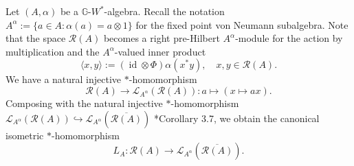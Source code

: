 \documentclass[reqno]{amsart}
\numberwithin{equation}{section}
\DeclareMathOperator{\id}{\mathrm{id}}
\newcommand{\G}{\mathbb{G}}
\begin{document}
Let $(A, \alpha)$ be a $\G$-$W^*$-algebra. Recall the notation $A^\alpha:= \{a\in A: \alpha(a)= a \otimes 1\}$ for the fixed point von Neumann subalgebra. Note that the space $\mathcal{R}(A)$ becomes a right pre-Hilbert $A^\alpha$-module for the action by multiplication and the $A^\alpha$-valued inner product
$$\langle x, y\rangle := (\id \otimes \Phi)\alpha(x^*y), \quad x,y\in \mathcal{R}(A).$$
We have a natural injective $*$-homomorphism
$$\mathcal{R}(A)\to \mathscr{L}_{A^\alpha}(\mathcal{R}(A)): a \mapsto (x \mapsto ax).$$
Composing with the natural injective $*$-homomorphism
$\mathscr{L}_{A^\alpha}(\mathcal{R}(A))\hookrightarrow \mathscr{L}_{A^\alpha}(\overline{\mathcal{R}(A)})$ \cite{Pa73}*{Corollary 3.7}, we obtain
the canonical isometric $*$-homomorphism
$$L_A: \mathcal{R}(A)\to \mathscr{L}_{A^\alpha}(\overline{\mathcal{R}(A)}).$$
\end{document}
